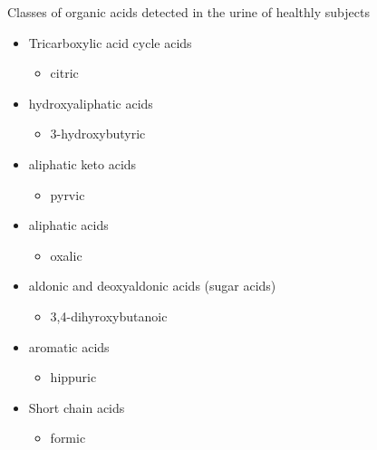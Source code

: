 \documentclass[presentation, smaller]{beamer}
\begin{document}
\begin{frame}[label={sec:orgheadline5}]{Classes of organic acids detected in the urine of  healthly subjects}
\begin{itemize}
\item Tricarboxylic acid cycle acids
\begin{itemize}
\item citric
\end{itemize}
\item hydroxyaliphatic acids
\begin{itemize}
\item 3-hydroxybutyric
\end{itemize}
\item aliphatic keto acids
\begin{itemize}
\item pyrvic
\end{itemize}
\item aliphatic acids
\begin{itemize}
\item oxalic
\end{itemize}
\item aldonic and deoxyaldonic acids (sugar acids)
\begin{itemize}
\item 3,4-dihyroxybutanoic
\end{itemize}
\item aromatic acids
\begin{itemize}
\item hippuric
\end{itemize}
\item Short chain acids
\begin{itemize}
\item formic
\end{itemize}
\end{itemize}
\end{frame}
\end{document}
